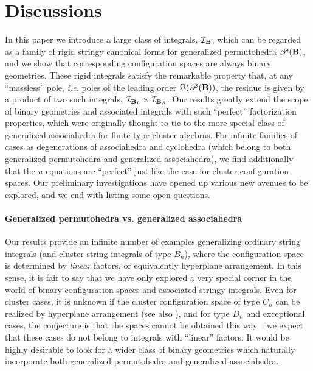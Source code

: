 \documentclass[hidelinks,12pt]{article}
\begin{document}
\section{Discussions}

In this paper we introduce a large class of integrals,  ${\cal I}_{\bf B}$, which can be regarded as a family of rigid stringy canonical forms %
for generalized permutohedra ${\mathscr P}(\bf B)$, and we show that corresponding configuration spaces are always binary geometries. These rigid integrals satisfy the remarkable property that, at any ``massless'' pole, {\it i.e.} poles of the leading order $\Omega({\mathscr P}(\bf B) )$, the residue is given by a product of two such integrals, ${\cal I}_{{\bf B}_L} \times {\cal I}_{{\bf B}_R}$. Our results greatly extend the scope of binary geometries and associated integrals with such ``perfect'' factorization properties, which were originally thought to tie to the more special class of generalized associahedra for finite-type cluster algebras. For infinite families of cases as degenerations of associahedra and cyclohedra (which belong to both generalized permutohedra and generalized associahedra), we find additionally that the $u$ equations are ``perfect'' just like the case for cluster configuration spaces. Our preliminary investigations have opened up various new avenues to be explored, and we end with listing some open questions.

\paragraph{Generalized permutohedra vs. generalized associahedra} Our results provide an infinite number of examples generalizing ordinary string integrals (and cluster string integrals of type $B_n$), where the configuration space is determined by {\it linear} factors, or equivalently hyperplane arrangement. In this sense, it is fair to say that we have only explored a very special corner in the world of binary configuration spaces and associated stringy integrals. Even for cluster cases, it is unknown if the cluster configuration space of type $C_n$ can be realized by hyperplane arrangement (see also \cite{Li:2018mnq}), and for type $ D_n$ and exceptional cases, the conjecture is that the spaces cannot be obtained this way~\cite{Arkani-Hamed:2019plo}; we expect that these cases do not belong to integrals with ``linear'' factors. It would be highly desirable to look for a wider class of binary geometries which naturally incorporate both generalized permutohedra and generalized associahedra. 
\end{document}
